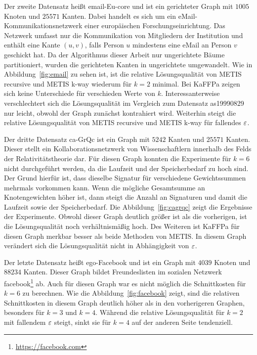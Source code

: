 Der zweite Datensatz heißt email-Eu-core und ist ein gerichteter Graph mit $1005$ Knoten und $25571$ Kanten.
Dabei handelt es sich um ein eMail\hyp Kommunikationsnetzwerk einer europäischen Forschungseinrichtung.
Das Netzwerk umfasst nur die Kommunikation von Mitgliedern der Institution und enthält eine Kante $(u, v)$, falls Person $u$ mindestens eine eMail an Person $v$ geschickt hat.
Da der Algorithmus dieser Arbeit nur ungerichtete Bäume partitioniert, wurden die gerichteten Kanten in ungerichtete umgewandelt.
Wie in Abbildung~\ref{fig:email} zu sehen ist, ist die relative Lösungsqualität von METIS recursive und METIS k-way wiederum für $k=2$ minimal.
Bei KaFFPa zeigen sich keine Unterschiede für verschieden Werte von $k$.
Interessanterweise verschlechtert sich die Lösungsqualität im Vergleich zum Datensatz as19990829 nur leicht, obwohl der Graph zunächst kontrahiert wird.
Weiterhin steigt die relative Lösungsqualität von METIS recursive und METIS k-way für fallendes $\varepsilon$.

Der dritte Datensatz ca-GrQc ist ein Graph mit $5242$ Kanten und $25571$ Kanten.
Dieser stellt ein Kollaborationsnetzwerk von Wissenschaftlern innerhalb des Felds der Relativitätstheorie dar.
Für diesen Graph konnten die Experimente für $k=6$ nicht durchgeführt werden, da die Laufzeit und der Speicherbedarf zu hoch sind. 
Der Grund hierfür ist, dass dieselbe Signatur für verschiedene Gewichtssummen mehrmals vorkommen kann. 
Wenn die mögliche Gesamtsumme an Knotengewichten höher ist, dann steigt die Anzahl an Signaturen und damit die Laufzeit sowie der Speicherbedarf.
Die Abbildung~\ref{fig:cagrqc} zeigt die Ergebnisse der Experimente.
Obwohl dieser Graph deutlich größer ist als die vorherigen, ist die Lösungsqualität noch verhältnismäßig hoch.
Des Weiteren ist KaFFPa für diesen Graph merkbar besser als beide Methoden von METIS.
In diesem Graph verändert sich die Lösungsqualität nicht in Abhängigkeit von $\varepsilon$.

Der letzte Datensatz heißt ego-Facebook und ist ein Graph mit $4039$ Knoten und $88234$ Kanten.
Dieser Graph bildet Freundeslisten im sozialen Netzwerk facebook\footnote{\url{https://facebook.com}} ab.
Auch für diesen Graph war es nicht möglich die Schnittkosten für $k=6$ zu berechnen.
Wie die Abbildung~\ref{fig:facebook} zeigt, sind die relativen Schnittkosten in diesem Graph deutlich höher als in den vorherigeren Graphen, besonders für $k=3$ und $k=4$.
Während die relative Lösungsqualität für $k=2$ mit fallendem $\varepsilon$ steigt, sinkt sie für $k=4$ auf der anderen Seite tendenziell.

